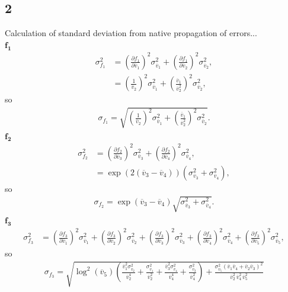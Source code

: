 \documentclass[singlepage,notitlepage,nofootinbib,11pt]{revtex4-1}
\newcommand{\eq}[1]{\begin{align*}#1\end{align*}}
\def\l{\left}
\def\r{\right}
\begin{document}
\subsection{2}
Calculation of standard deviation from native propagation of errors...\\
$\mathbf{f_1}$
\eq{
\sigma_{f_1}^2 &= \l(\frac{\partial f_1}{\partial \overline{v}_1}\r)^2\sigma_{\overline{v}_1}^2 + \l(\frac{\partial f_1}{\partial \overline{v}_2}\r)^2\sigma_{\overline{v}_2}^2,\\
&=\l(\frac{1}{\overline{v}_2}\r)^2\sigma_{\overline{v}_1}^2 + \l(\frac{\overline{v}_1}{\overline{v}_2^2}\r)^2\sigma_{\overline{v}_2}^2,
}
so
\eq{
\boxed{\sigma_{f_1}=\sqrt{\l(\frac{1}{\overline{v}_2}\r)^2\sigma_{\overline{v}_1}^2 + \l(\frac{\overline{v}_1}{\overline{v}_2^2}\r)^2\sigma_{\overline{v}_2}^2}.}
}
$\mathbf{f_2}$
\eq{\sigma_{f_2}^2 &= \l(\frac{\partial f_2}{\partial \overline{v}_3}\r)^2\sigma_{\overline{v}_3}^2 + \l(\frac{\partial f_2}{\partial \overline{v}_4}\r)^2\sigma_{\overline{v}_4}^2,\\ 
  &=\exp\l(2(\overline{v}_3-\overline{v}_4)\r)\l(\sigma_{\overline{v}_3}^2+\sigma_{\overline{v}_4}^2\r),
}
so
\eq{
\boxed{ \sigma_{f_2} = \exp\l(\overline{v}_3-\overline{v}_4\r)\sqrt{\sigma_{\overline{v}_3}^2+\sigma_{\overline{v}_4}^2}}.
}
$\mathbf{f_3}$
\eq{
\sigma_{f_3}^2 &= \l(\frac{\partial f_3}{\partial \overline{v}_1}\r)^2\sigma_{\overline{v}_1}^2 + \l(\frac{\partial f_3}{\partial \overline{v}_2}\r)^2\sigma_{\overline{v}_2}^2 + \l(\frac{\partial f_3}{\partial \overline{v}_3}\r)^2\sigma_{\overline{v}_3}^2 + \l(\frac{\partial f_3}{\partial \overline{v}_4}\r)^2\sigma_{\overline{v}_4}^2 + \l(\frac{\partial f_3}{\partial \overline{v}_5}\r)^2\sigma_{\overline{v}_5}^2,
}
so
\eq{
\boxed{\sigma_{f_3} = \sqrt{\log^2(\overline{v}_5) \left(\frac{\overline{v}_1^2 \sigma_{\overline{v}_2}^2}{\overline{v}_2^4}+\frac{\sigma_{\overline{v}_1}^2}{\overline{v}_2^2}+\frac{\overline{v}_3^2 \sigma_{\overline{v}_4}^2}{\overline{v}_4^4}+\frac{\sigma_{\overline{v}_3}^2}{\overline{v}_4^2}\right)+\frac{\sigma_{\overline{v}_5}^2 (\overline{v}_1 \overline{v}_4+\overline{v}_2 \overline{v}_3)^2}{\overline{v}_2^2\,\overline{v}_4^2\,\overline{v}_5^2}}}
}
\end{document}
